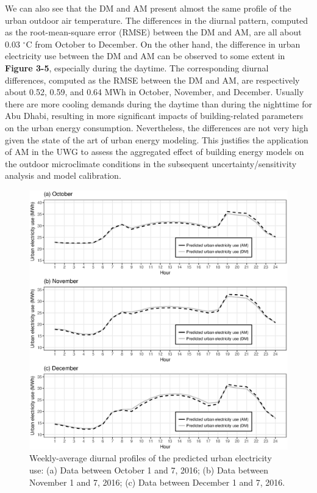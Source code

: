We can also see that the DM and AM present almost the same profile of the urban outdoor air temperature. The differences in the diurnal pattern, computed as the root-mean-square error (RMSE) between the DM and AM, are all about 0.03 $^{\circ}$C from October to December. On the other hand, the difference in urban electricity use between the DM and AM can be observed to some extent in \textbf{Figure 3-5}, especially during the daytime. The corresponding diurnal differences, computed as the RMSE between the DM and AM, are respectively about 0.52, 0.59, and 0.64 MWh in October, November, and December. Usually there are more cooling demands during the daytime than during the nighttime for Abu Dhabi, resulting in more significant impacts of building-related parameters on the urban energy consumption. Nevertheless, the differences are not very high given the state of the art of urban energy modeling. This justifies the application of AM in the UWG to assess the aggregated effect of building energy models on the outdoor microclimate conditions in the subsequent uncertainty/sensitivity analysis and model calibration.

\begin{figure}
\centering
\includegraphics[width=.8\linewidth]{Figure3-5.eps}
\caption{Weekly-average diurnal profiles of the predicted urban electricity use: (a) Data between October 1 and 7, 2016; (b) Data between November 1 and 7, 2016; (c) Data between December 1 and 7, 2016.}
\end{figure}

